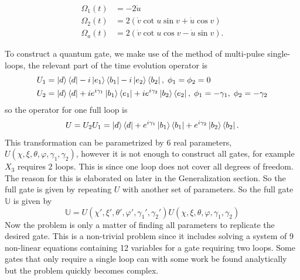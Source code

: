 \begin{equation}
\begin{aligned}
\Omega_1(t) &= -2\dot{u}
\\ 
\Omega_2(t) &= 2\left(\dot{v}\cot u\sin v + \dot{u}\cos v \right)
\\
\Omega_a(t) &= 2\left(\dot{v}\cot u\cos v - \dot{u}\sin v \right).
\end{aligned}
\end{equation}

To construct a quantum gate, we make use of the method of multi-pulse single-loops\cite{sLoop}, the relevant part of the time evolution operator is
\begin{equation}
\begin{aligned}&
U_1 = \ket{d}\bra{d} -i\ket{e_1}\bra{b_1} -i\ket{e_2}\bra{b_2},\; \phi_1 = \phi_2 = 0
\\&
U_2 = \ket{d}\bra{d} +ie^{i\gamma_1}\ket{b_1}\bra{e_1} +ie^{i\gamma_2}\ket{b_2}\bra{e_2},\; \phi_1 = -\gamma_1,\; \phi_2 = -\gamma_2
\end{aligned}
\end{equation}
so the operator for one full loop is 
\begin{equation}
\label{eq:trit-gate-1-loop}
U = U_2U_1 = \ket{d}\bra{d} + e^{i\gamma_1}\ket{b_1}\bra{b_1} + e^{i\gamma_2}\ket{b_2}\bra{b_2}.
\end{equation}
This transformation can be parametrized by $6$ real parameters, $U(\chi,\xi,\theta,\varphi,\gamma_1,\gamma_2)$, however it is not enough to construct all gates, for example $X_3$ requires 2 loops. This is since one loop does not cover all degrees of freedom. The reason for this is elaborated on later in the Generalization section. So the full gate is given by repeating $U$ with another set of parameters. So the full gate $\mathbb{U}$ is given by 
\begin{equation}
\label{eq:trit-gate-2-loop}
\mathbb{U} = U(\chi',\xi',\theta',\varphi',\gamma_1',\gamma_2') U(\chi,\xi,\theta,\varphi,\gamma_1,\gamma_2)
\end{equation}
Now the problem is only a matter of finding all parameters to replicate the desired gate. This is a non-trivial problem since it includes solving a system of 9 non-linear equations containing 12 variables for a gate requiring two loops. Some gates that only require a single loop can with some work be found analytically but the problem quickly becomes complex.

